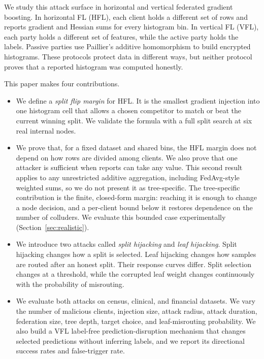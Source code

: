 \documentclass[11pt]{article}
\newcommand{\rev}[1]{#1}
\begin{document}
We study this attack surface in horizontal and vertical federated gradient boosting. In horizontal FL (HFL), each client holds a different set of rows and reports gradient and Hessian sums for every histogram bin. In vertical FL (VFL), each party holds a different set of features, while the active party holds the labels. Passive parties use Paillier's additive homomorphism to build encrypted histograms. These protocols protect data in different ways, but neither protocol proves that a reported histogram was computed honestly.

This paper makes four contributions.

\begin{itemize}
  \item We define a \emph{split flip margin} for HFL. It is the smallest gradient injection into one histogram cell that allows a chosen competitor to match or beat the current winning split. We validate the formula with a full split search at six real internal nodes.

  \item We prove that, for a fixed dataset and shared bins, the HFL margin does not depend on how rows are divided among clients. We also prove that one attacker is sufficient when reports can take any value. This second result applies to any unrestricted additive aggregation, including FedAvg-style weighted sums, so we do not present it as tree-specific. \rev{The tree-specific contribution is the finite, closed-form margin: reaching it is enough to change a node decision, and a per-client bound below it restores dependence on the number of colluders. We evaluate this bounded case experimentally (Section~\ref{sec:realistic}).}

  \item We introduce two attacks called \emph{split hijacking} and \emph{leaf hijacking}. Split hijacking changes how a split is selected. Leaf hijacking changes how samples are routed after an honest split. Their response curves differ. Split selection changes at a threshold, while the corrupted leaf weight changes continuously with the probability of misrouting.

  \item We evaluate both attacks on census, clinical, and financial datasets. We vary the number of malicious clients, injection size, attack radius, attack duration, federation size, tree depth, target choice, and leaf-misrouting probability. We also build a VFL \rev{label-free prediction-disruption mechanism} that changes selected predictions without inferring labels\rev{, and we report its directional success rates and false-trigger rate}.
\end{itemize}
\end{document}
